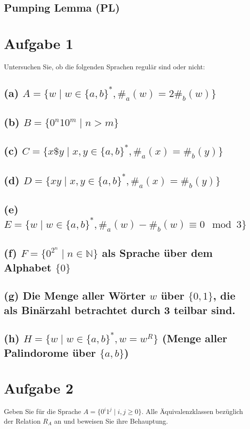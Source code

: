 \documentclass[titlepage]{article}
\renewcommand{\]}{\right]}
\renewcommand{\[}{\left[}
\renewcommand{\)}{\right)}
\renewcommand{\(}{\left(}
\renewcommand{\|}{\;|\;}
\begin{document}
\begingroup\let\clearpage\relax
	
	
	\subsection*{Pumping Lemma (PL)}
		
	
	\section*{Aufgabe 1}
		Untersuchen Sie, ob die folgenden Sprachen regulär sind oder nicht:
		\subsection*{(a) $A=\{w\mid w\in\{a,b\}^*,\#_a(w)=2\#_b(w)\}$}
			
		\subsection*{(b) $B=\{0^n10^m\mid n>m\}$}
			
		\subsection*{(c) $C=\{x\$y\mid x,y\in\{a,b\}^*,\#_a(x)=\#_b(y)\}$}
			
		\subsection*{(d) $D=\{xy\mid x,y\in\{a,b\}^*,\#_a(x)=\#_b(y)\}$}
			
		\subsection*{(e) $E=\{w\mid w\in\{a,b\}^*,\#_a(w)-\#_b(w)\equiv0\mod3\}$}
			
		\subsection*{(f) $F=\{0^{2^n}\mid n\in\mathbb{N}\}$ als Sprache über dem Alphabet $\{0\}$}
			
		\subsection*{(g) Die Menge aller Wörter $w$ über $\{0,1\}$, die als Binärzahl betrachtet durch 3 teilbar sind.}
			
		\subsection*{(h) $H=\{w\mid w\in\{a,b\}^*,w=w^R\}$ (Menge aller Palindorome über $\{a,b\}$)}
			
		
	\section*{Aufgabe 2}
		Geben Sie für die Sprache $A=\{0^i1^j\mid i,j\ge0\}.$ Alle Äquivalenzklassen bezüglich der Relation $R_A$ an und beweisen Sie ihre Behauptung.
		
	
\endgroup
\end{document}
